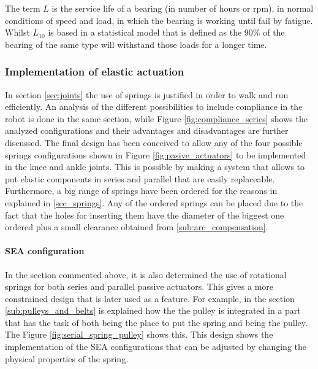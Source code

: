 The term $L$ is the service life of a bearing (in number of hours or rpm), in normal conditions of speed and load, in which the bearing is working until fail by fatigue. 
Whilst $L_{10}$ is based in a statistical model that is defined as the 90\% of the bearing of the same type will withstand those loads for a longer time.

\subsubsection{Implementation of elastic actuation} %


\label{ssub:spring_integration}
In section \ref{sec:joints} the use of springs is justified in order to walk and run efficiently. 
An analysis of the different possibilities to include compliance in the robot is done in the same section, while Figure \ref{fig:compliance_series} shows the analyzed configurations and their advantages and disadvantages are further discussed.
The final design has been conceived to allow any of the four possible springs configurations shown in Figure \ref{fig:pasive_actuators} to be implemented in the knee and ankle joints.
This is possible by making a system that allows to put elastic components in series and parallel that are easily replaceable.
Furthermore, a big range of springs have been ordered for the reasons in explained in \ref{sec_springs}.
Any of the ordered springs can be placed due to the fact that the holes for inserting them have the diameter of the biggest one ordered plus a small clearance obtained from \ref{sub:arc_compensation}.

\paragraph{SEA configuration} %
\label{para:sea_configuration}

In the section commented above, it is also determined the use of rotational springs for both series and parallel passive actuators.
This gives a more constrained design that is later used as a feature.
For example, in the section \ref{sub:pulleys_and_belts} is explained how the the pulley is integrated in a part that has the task of both being the place to put the spring and being the pulley.
The Figure \ref{fig:serial_spring_pulley} shows this.
This design shows the implementation of the SEA configurations that can be adjusted by changing the physical properties of the spring.

